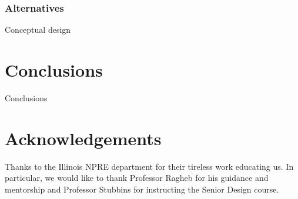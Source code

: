 \documentclass[12pt]{article}
\begin{document}
\subsubsection{Alternatives}
Conceptual design
\section{Conclusions}
Conclusions


\section{Acknowledgements}
Thanks to the Illinois NPRE department for their tireless work educating us. In particular, we would like to thank Professor Ragheb for his guidance and mentorship and Professor Stubbins for instructing the Senior Design course.



\end{document}
